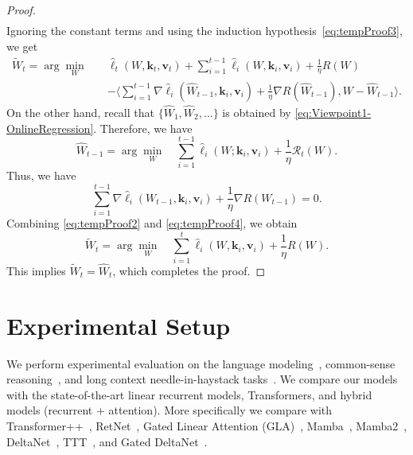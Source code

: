 \documentclass{article}
\newcommand{\citep}{\parencite}
\newcommand{\vk}[0]{\mathbf{k}}
\newcommand{\vvv}[0]{\mathbf{v}}
\theoremstyle{plain}
\theoremstyle{definition}
\theoremstyle{remark}
\begin{document}
\begin{proof}
\begin{equation}
\begin{split}
\end{split}
\end{equation}
Ignoring the constant terms and using the induction hypothesis~\eqref{eq:tempProof3}, we get 
\begin{equation}
\label{eq:tempProof4}
\begin{split}
 \widetilde{W}_{t} = \arg\min_{W} \quad &\widehat{\ell}_t (W,\vk_t,\vvv_t) + \sum_{i=1}^{t-1} \widehat{\ell}_i (W,\vk_i,\vvv_i) + \frac{1}{\eta} R(W) \\
    & - \Bigg\langle \sum_{i=1}^{t-1} \nabla \widehat{\ell}_i (\widehat{W}_{t-1}, \vk_i,\vvv_i) + \frac{1}{\eta} \nabla R(\widehat{W}_{t-1}), W - \widehat{W}_{t-1} \Bigg\rangle.
\end{split}
\end{equation}
On the other hand, recall that $\{\widehat{W}_1,\widehat{W}_2,\ldots\}$ is obtained by \eqref{eq:Viewpoint1-OnlineRegression}. Therefore, we have
\[
\widehat{W}_{t-1} = \arg\min_{W}\quad \sum_{i=1}^{t-1} \widehat{\ell}_i(W;\vk_i, \vvv_i)  + \frac{1}{\eta} \mathcal{R}_t(W).
\]
Thus,  we have
\begin{equation}
\label{eq:tempProof2}
    \sum_{i=1}^{t-1} \nabla \widehat{\ell}_i (W_{t-1}, \vk_i,\vvv_i) + \frac{1}{\eta} \nabla R(W_{t-1}) = 0.
\end{equation}
Combining \eqref{eq:tempProof2} and \eqref{eq:tempProof4}, we obtain
\[
\widetilde{W}_{t} = \arg\min_{W} \quad  \sum_{i=1}^{t} \widehat{\ell}_i (W,\vk_i,\vvv_i) + \frac{1}{\eta} R(W).
\]
This implies $\widetilde{W}_t = \widehat{W}_t$, which completes the proof.
\end{proof}





\section{Experimental Setup}\label{app:exp-details}
We perform experimental evaluation on the language modeling~\citep{merity2017pointer, paperno-etal-2016-lambada}, common-sense reasoning~\citep{bisk2020piqa, zellers-etal-2019-hellaswag, sakaguchi2021winogrande,clark2018think, clark-etal-2019-boolq}, and long context needle-in-haystack tasks~\citep{hsieh2024ruler}. We compare our models with the state-of-the-art linear recurrent models, Transformers, and hybrid models (recurrent + attention). More specifically we compare with Transformer++~\citep{touvron2023llama}, RetNet~\citep{sun2023retentive}, Gated Linear Attention (GLA)~\citep{yang2024gatedattn}, Mamba~\citep{gu2024mamba}, Mamba2~\citep{dao2024transformers}, DeltaNet~\citep{yang2024parallelizing}, TTT~\citep{sun2024learning}, and Gated DeltaNet~\citep{yang2024gated}. 
\end{document}
